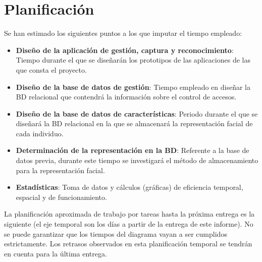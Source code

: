 \section{Planificación}
Se han estimado los siguientes puntos a los que imputar el tiempo empleado:
\begin{itemize}
	\item{\textbf{Diseño de la aplicación de gestión, captura y reconocimiento}: Tiempo durante el que se diseñarán los prototipos de las aplicaciones de las que consta el proyecto.}
	\item{\textbf{Diseño de la base de datos de gestión}: Tiempo empleado en diseñar la BD relacional que contendrá la información sobre el control de accesos.}
	\item{\textbf{Diseño de la base de datos de características}: Periodo durante el que se diseñará la BD relacional en la que se almacenará la representación facial de cada individuo.}
	\item{\textbf{Determinación de la representación en la BD}: Referente a la base de datos previa, durante este tiempo se investigará el método de almacenamiento para la representación facial.}
	\item{\textbf{Estadísticas}: Toma de datos y cálculos (gráficas) de eficiencia temporal, espacial y de funcionamiento.}
\end{itemize}
La planificación aproximada de trabajo por tareas hasta la próxima entrega es la siguiente (el eje temporal son los días a partir de la entrega de este informe). No se puede garantizar que los tiempos del diagrama vayan a ser cumplidos estrictamente. Los retrasos observados en esta planificación temporal se tendrán en cuenta para la última entrega.

